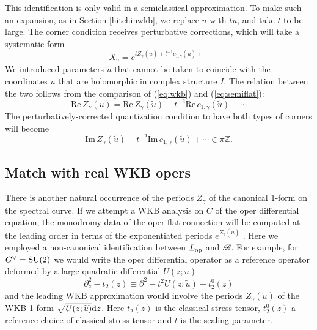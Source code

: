 \documentclass[11pt,a4paper]{article}
\begin{document}
This identification is only valid in a semiclassical approximation.  To make such an expansion, as in Section \ref{hitchinwkb}, we replace $u$ with $tu$, and
take $t$ to be large.   The corner condition receives perturbative corrections, which 
will take a systematic form 
 \begin{equation}
X_\gamma = e^{t Z_\gamma(\tilde u) + t^{-1} c_{1,\gamma}(\tilde u) + \cdots}
\end{equation}
We introduced parameters $\tilde u$  that cannot be taken to coincide with 
the  coordinates $u$ that are holomorphic in complex structure $I$. The relation between the two follows from the comparison of (\ref{eq:wkb}) and (\ref{eq:semiflat}):
\begin{equation}
\mathrm{Re}\,Z_\gamma(u) = \mathrm{Re}\,Z_\gamma(\tilde u) + t^{-2} \mathrm{Re}\,c_{1,\gamma}(\tilde u) + \cdots
\end{equation}
The perturbatively-corrected quantization condition to have both types of corners will become 
\begin{equation}
\mathrm{Im}\,Z_\gamma(\tilde u) + t^{-2} \mathrm{Im}\,c_{1,\gamma}(\tilde u) + \cdots \in \pi \mathbb{Z}.
\end{equation}
 
\subsection{Match with real WKB opers}
There is another natural occurrence of the periods $Z_\gamma$ of the canonical 1-form on the spectral curve. If we attempt a WKB analysis on $C$ of the oper differential equation, the monodromy data of the oper flat connection will be computed at the leading order in terms of the exponentiated periods $e^{Z_\gamma(\tilde u) }$ \cite{Voros1,Voros2,Voros3,Voros4,Gaiotto:2014bza}. Here we employed a non-canonical identification between $L_{{\mathrm{op}}}$ and ${{\mathscr B}}$. For example, for $G^\vee = {\mathrm{SU}}(2)$ we would write the oper differential operator as a reference operator deformed by a large quadratic differential $U(z;\tilde u)$ 
\begin{equation}
\partial^2_z - t_2(z) \equiv \partial^2 - t^2 U(z;\tilde u)- t_2^{0}(z) 
\end{equation}
and the leading WKB approximation would involve the periods $Z_\gamma(\tilde u)$ of the WKB 1-form $\sqrt{U(z;\widetilde u)} \mathrm d z$. Here $t_2(z)$ is the classical stress tensor, $t_2^0(z)$ a reference choice of classical stress tensor and $t$ is the scaling parameter.
\end{document}
